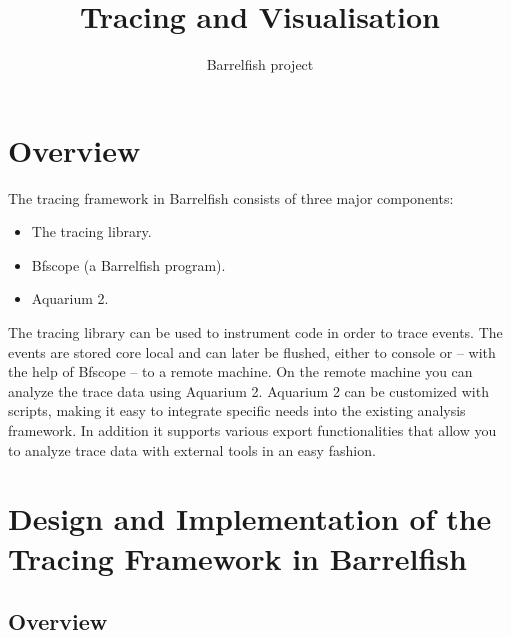 \documentclass[a4paper,11pt,twoside]{report}
\title{Tracing and Visualisation}
\author{Barrelfish project}
\begin{document}
\maketitle			%

\begin{versionhistory}
\end{versionhistory}

\tableofcontents		%


\chapter{Overview}

The tracing framework in Barrelfish consists of three major components:

\begin{itemize}
	\item The tracing library.
	\item Bfscope (a Barrelfish program).
	\item Aquarium 2.
\end{itemize}

The tracing library can be used to instrument code in order to trace events.
The events are stored core local and can later be flushed, either to console
or -- with the help of Bfscope -- to a remote machine. On the remote machine
you can analyze the trace data using Aquarium 2. Aquarium 2 can be customized with scripts,
making it easy to integrate specific needs into the existing analysis framework.
In addition it supports various export functionalities that allow you to analyze
trace data with external tools in an easy fashion.

\chapter{Design and Implementation of the Tracing Framework in Barrelfish}

\section{Overview\label{sec:trace-overview}}
\end{document}
